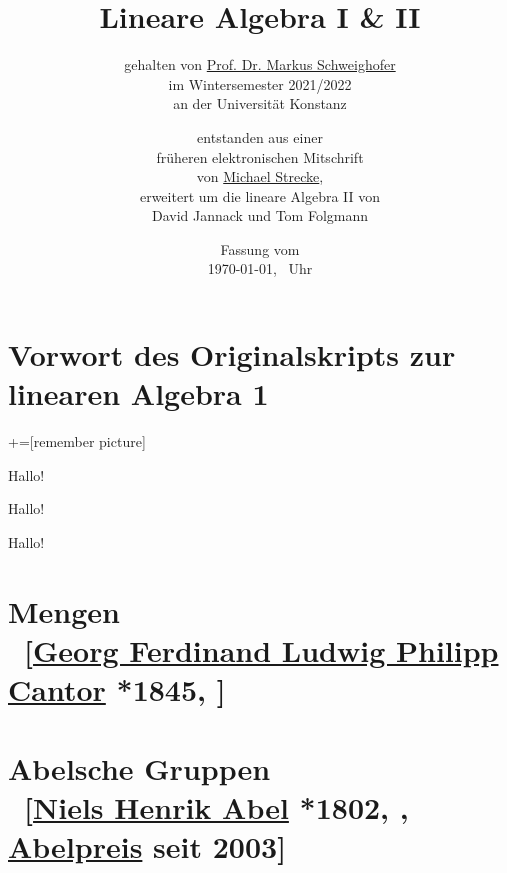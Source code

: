 \documentclass[
twoside=semi, %
fontsize=12,
DIV=12, %
cleardoublepage=current,
leqno,
headings=optiontoheadandtoc, %
toc=idx %
]{scrbook}
\theoremstyle{definition}
\DeclareMathOperator\im{im}
\newenvironment{cproof}{\begin{tcolorbox}\begin{oproof}}{\qedhere\end{oproof}\end{tcolorbox}}
\renewenvironment{proof}{\begin{cproof}}{\end{cproof}}
\begin{document}
\subject{Skript zur Vorlesung}
\title{Lineare Algebra I \& II}
\subtitle{gehalten von \href{http://www.math.uni-konstanz.de/~schweigh/}{Prof. Dr. Markus Schweighofer}\\im Wintersemester 2021/2022\\an der Universität Konstanz}
\author{\small entstanden aus einer\\
\small früheren elektronischen Mitschrift\\
\small von \href{https://www.is.mpg.de/person/mstrecke}{Michael Strecke}, \\
\small erweitert um die lineare Algebra II von \\
\small David Jannack und Tom Folgmann}
\date{Fassung vom\\\today, \currenttime\ Uhr}
\frontmatter
\pagestyle{empty}

\maketitle

\noindent
    

\chapter*{Vorwort des Originalskripts zur linearen Algebra 1}
\pagestyle{scrheadings}
\manualmark
    

\tableofcontents

\mainmatter
{}+=[remember picture]

\begin{oproof}
    Hallo!
\end{oproof}
\begin{proof}
    Hallo!
\end{proof}
\begin{cproof}
    Hallo!
\end{cproof}

\chapter[tocentry={Mengen}]{Mengen \\ ~{\small[\href{http://de.wikipedia.org/wiki/Georg_Cantor}{Georg Ferdinand Ludwig Philipp Cantor} *1845, ]}}
    
    

\chapter[tocentry={Abelsche Gruppen}]{Abelsche Gruppen \\ ~{\small[\href{http://de.wikipedia.org/wiki/Niels_Henrik_Abel}{Niels Henrik Abel} *1802, , \href{http://de.wikipedia.org/wiki/Abelpreis}{Abelpreis} seit 2003]}}
    
\end{document}
